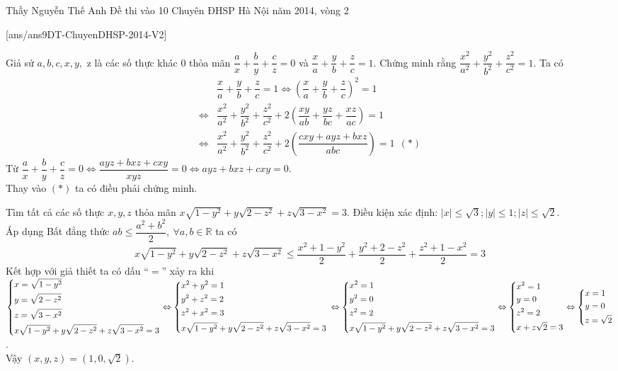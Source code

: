 \begin{name}
{Thầy  Nguyễn Thế Anh}
{Đề thi vào 10 Chuyên ĐHSP Hà Nội năm 2014, vòng 2}
\end{name}
\setcounter{ex}{0}
[ans/ans9DT-ChuyenDHSP-2014-V2]
\begin{ex}%
   Giả sử $a,b,c,x,y,$ z là các số thực khác $0$
thỏa mãn $\dfrac{a}{x}+\dfrac{b}{y}+\dfrac{c}{z}=0$ và $\dfrac{x}{a}+\dfrac{y}{b}+\dfrac{z}{c}=1$. Chứng minh rằng $\dfrac{x^2}{a^2}+\dfrac{y^2}{b^2}+\dfrac{z^2}{c^2}=1$.
\loigiai
{
Ta có
\begin{align*}
	&\dfrac{x}{a} + \dfrac{y}{b} + \dfrac{z}{c}=1 \Leftrightarrow \left(\dfrac{x}{a}+\dfrac{y}{b}+\dfrac{z}{c}\right)^2=1 \\
	\Leftrightarrow &\dfrac{x^2}{a^2}+\dfrac{y^2}{b^2}+\dfrac{z^2}{c^2}+2\left(\dfrac{xy}{ab}+\dfrac{yz}{bc}+\dfrac{xz}{ac}\right)=1 \\ \Leftrightarrow &\dfrac{x^2}{a^2}+\dfrac{y^2}{b^2}+\dfrac{z^2}{c^2}+2\left(\dfrac{cxy+ayz+bxz}{abc}\right)=1~~(*)
\end{align*}
Từ $\dfrac{a}{x}+\dfrac{b}{y}+\dfrac{c}{z}=0\Leftrightarrow \dfrac{ayz+bxz+cxy}{xyz}=0\Leftrightarrow ayz+bxz+cxy=0$.\\
Thay vào $(*)$ ta có điều phải chứng minh.
}
\end{ex}

\begin{ex}%
Tìm tất cả các số thực $x,y,z$ thỏa mãn $x\sqrt{1-y^2}+y\sqrt{2-z^2}+z\sqrt{3-x^2}=3$.
\loigiai
{
Điều kiện xác định:  $\left| x\right|\le \sqrt{3};\left| y\right|\le 1;\left| z\right|\le \sqrt{2}$.\\
Áp dụng Bất đẳng thức $ab \le \dfrac{a^2+b^2}{2},~\forall a,b \in \mathbb{R}$ ta có
\[x\sqrt{1-y^2}+y\sqrt{2-z^2}+z\sqrt{3-x^2}\le \dfrac{x^2+1-y^2}{2}+\dfrac{y^2+2-z^2}{2}+\dfrac{z^2+1-x^2}{2}=3\]
Kết hợp với giả thiết ta có dấu ``$=$'' xảy ra khi\\
$\left\{\begin{aligned}& x=\sqrt{1-y^2} \\ & y=\sqrt{2-z^2} \\ & z=\sqrt{3-x^2} \\
& x\sqrt{1-y^2}+y\sqrt{2-z^2}+z\sqrt{3-x^2}=3
\end{aligned}\right. \Leftrightarrow \left\{\begin{aligned}& x^2+y^2=1 \\ & y^2+z^2=2 \\ & z^2+x^2=3 \\ & x\sqrt{1-y^2}+y\sqrt{2-z^2}+z\sqrt{3-x^2}=3
\end{aligned}\right. \\
\Leftrightarrow \left\{\begin{aligned}& x^2=1 \\ & y^2=0 \\ & z^2=2 \\ & x\sqrt{1-y^2}+y\sqrt{2-z^2}+z\sqrt{3-x^2}=3
\end{aligned}\right. \Leftrightarrow \left\{\begin{aligned}& x^2=1 \\ & y=0 \\ & z^2=2 \\& x+z\sqrt{2}=3\end{aligned}\right. \Leftrightarrow \left\{\begin{aligned}& x=1 \\ & y=0 \\ & z=\sqrt{2}\end{aligned}\right.$. \\
Vậy $(x,y,z)=(1,0,\sqrt{2})$.
}
\end{ex}

